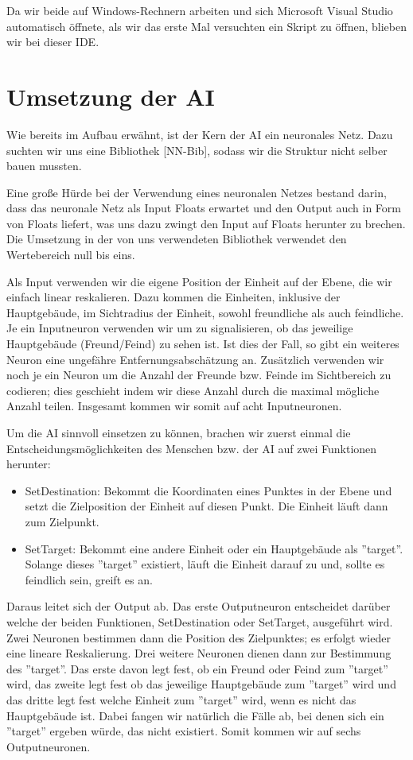 \documentclass[
	12pt,
	a4paper,
	BCOR10mm,
	DIV14,
	headsepline,
	usegeometry,
]{scrreprt}
\begin{document}
Da wir beide auf Windows-Rechnern arbeiten und sich Microsoft Visual Studio automatisch öffnete, als wir das erste Mal versuchten ein Skript zu öffnen, blieben wir bei dieser IDE.

\section{Umsetzung der AI}
Wie bereits im Aufbau erwähnt, ist der Kern der AI ein neuronales Netz.
Dazu suchten wir uns eine Bibliothek [NN-Bib], sodass wir die Struktur nicht selber bauen mussten.

Eine große Hürde bei der Verwendung eines neuronalen Netzes bestand darin, dass das neuronale Netz als Input Floats erwartet und den Output auch in Form von Floats liefert, was uns dazu zwingt den Input auf Floats herunter zu brechen.
Die Umsetzung in der von uns verwendeten Bibliothek verwendet den Wertebereich null bis eins.

Als Input verwenden wir die eigene Position der Einheit auf der Ebene, die wir einfach linear reskalieren.
Dazu kommen die Einheiten, inklusive der Hauptgebäude, im Sichtradius der Einheit, sowohl freundliche als auch feindliche.
Je ein Inputneuron verwenden wir um zu signalisieren, ob das jeweilige Hauptgebäude (Freund/Feind) zu sehen ist.
Ist dies der Fall, so gibt ein weiteres Neuron eine ungefähre Entfernungsabschätzung an.
Zusätzlich verwenden wir noch je ein Neuron um die Anzahl der Freunde bzw. Feinde im Sichtbereich zu codieren; dies geschieht indem wir diese Anzahl durch die maximal mögliche Anzahl teilen.
Insgesamt kommen wir somit auf acht Inputneuronen.

Um die AI sinnvoll einsetzen zu können, brachen wir zuerst einmal die Entscheidungsmöglichkeiten des Menschen bzw. der AI auf zwei Funktionen herunter: 

\begin{itemize}
	\item SetDestination: Bekommt die Koordinaten eines Punktes in der Ebene und setzt die Zielposition der Einheit auf diesen Punkt.
Die Einheit läuft dann zum Zielpunkt.
	\item SetTarget: Bekommt eine andere Einheit oder ein Hauptgebäude als ''target''.
Solange dieses ''target'' existiert, läuft die Einheit darauf zu und, sollte es feindlich sein, greift es an.
\end{itemize}

Daraus leitet sich der Output ab.
Das erste Outputneuron entscheidet darüber welche der beiden Funktionen, SetDestination oder SetTarget, ausgeführt wird.
Zwei Neuronen bestimmen dann die Position des Zielpunktes; es erfolgt wieder eine lineare Reskalierung.
Drei weitere Neuronen dienen dann zur Bestimmung des ''target''.
Das erste davon legt fest, ob ein Freund oder Feind zum ''target'' wird, das zweite legt fest ob das jeweilige Hauptgebäude zum ''target'' wird und das dritte legt fest welche Einheit zum ''target'' wird, wenn es nicht das Hauptgebäude ist.
Dabei fangen wir natürlich die Fälle ab, bei denen sich ein ''target'' ergeben würde, das nicht existiert.
Somit kommen wir auf sechs Outputneuronen.
\end{document}
